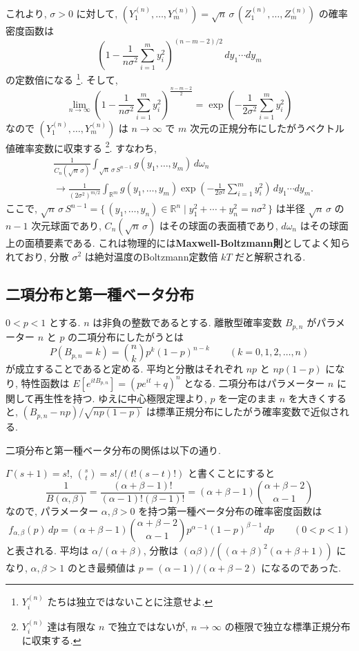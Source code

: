 \documentclass[12pt,twoside]{jarticle}
\newcommand\R{{\mathbb R}} %
\theoremstyle{jplain}
\theoremstyle{jplain}
\theoremstyle{jplain}
\numberwithin{theorem}{section}
\numberwithin{equation}{section}
\numberwithin{figure}{section}
\numberwithin{table}{section}
\begin{document}
これより, $\sigma>0$ に対して, \(
 (Y^{(n)}_1,\ldots,Y^{(n)}_m)
 =\sqrt{n}\,\sigma\,(Z^{(n)}_1,\ldots,Z^{(n)}_m)
\) の確率密度函数は
\[
\left(1-\frac{1}{n\sigma^2}\sum_{i=1}^m y_i^2 \right)^{(n-m-2)/2}\,dy_1\cdots dy_m
\]
の定数倍になる%
\footnote{$Y^{(n)}_i$ たちは独立ではないことに注意せよ.}. そして,
\[
\lim_{n\to\infty}
\left(1-\frac{1}{n\sigma^2}\sum_{i=1}^m y_i^2 \right)^{\frac{n-m-2}{2}}
=\exp\left( -\frac{1}{2\sigma^2} \sum_{i=1}^m y_i^2 \right)
\]
なので $(Y^{(n)}_1,\ldots,Y^{(n)}_m)$ は $n\to\infty$ で
$m$ 次元の正規分布にしたがうベクトル値確率変数に収束する%
\footnote{$Y^{(n)}_i$ 達は有限な $n$ で独立ではないが,
$n\to\infty$ の極限で独立な標準正規分布に収束する.}.
すなわち,
\begin{align*}
&
\frac{1}{C_n(\sqrt{n}\,\sigma)}
\int_{\sqrt{n}\,\sigma\,S^{n-1}} g(y_1,\ldots,y_m) \,d\omega_n
\\ &
\longrightarrow
\frac{1}{(2\sigma^2)^{m/2}}
\int_{\R^m} g(y_1,\ldots,y_m)
\exp\left( -\frac{1}{2\sigma^2}\sum_{i=1}^my_i^2 \right)\,dy_1\cdots dy_m.
\end{align*}
ここで, \(
 \sqrt{n}\,\sigma\,S^{n-1}
 =\{\,(y_1,\ldots,y_n)\in\R^n\mid y_1^2+\cdots+y_n^2=n\sigma^2 \,\}
\) は半径 $\sqrt{n}\,\sigma$ の $n-1$ 次元球面であり,
$C_n(\sqrt{n}\,\sigma)$ はその球面の表面積であり,
$d\omega_n$ はその球面上の面積要素である.
これは物理的には{\bfseries Maxwell-Boltzmann則}としてよく知られており,
分散 $\sigma^2$ は絶対温度のBoltzmann定数倍 $kT$ だと解釈される.


\subsection{二項分布と第一種ベータ分布}
\label{sec:Bin-Beta}

$0<p<1$ とする.
$n$ は非負の整数であるとする.
離散型確率変数 $B_{p,n}$ がパラメーター $n$ と $p$ の二項分布にしたがうとは
\[
P(B_{p,n}=k) = \binom{n}{k}p^k(1-p)^{n-k}
\qquad (k=0,1,2,\ldots,n)
\]
が成立することであると定める.  平均と分散はそれぞれ $np$ と $np(1-p)$ になり,
特性函数は $E[e^{itB_{p,n}}]=(pe^{it}+q)^n$ となる.
二項分布はパラメーター $n$ に関して再生性を持つ.
ゆえに中心極限定理より, $p$ を一定のまま $n$ を大きくすると,
$(B_{p,n}-np)/\sqrt{np(1-p)}$ は標準正規分布にしたがう確率変数で近似される.

二項分布と第一種ベータ分布の関係は以下の通り.

$\Gamma(s+1)=s!$, $\binom{s}{t}=s!/(t!(s-t)!)$ と書くことにすると
\[
\frac{1}{B(\alpha,\beta)}
=\frac{(\alpha+\beta-1)!}{(\alpha-1)!(\beta-1)!}
=(\alpha+\beta-1)\binom{\alpha+\beta-2}{\alpha-1}
\]
なので, パラメーター $\alpha,\beta>0$ を持つ第一種ベータ分布の確率密度函数は
\[
f_{\alpha,\beta}(p)\,dp
=(\alpha+\beta-1)\binom{\alpha+\beta-2}{\alpha-1} p^{\alpha-1}(1-p)^{\beta-1}\,dp
\qquad (0<p<1)
\]
と表される.
平均は $\alpha/(\alpha+\beta)$,
分散は $(\alpha\beta)/((\alpha+\beta)^2(\alpha+\beta+1))$ になり,
$\alpha,\beta>1$ のとき最頻値は $p=(\alpha-1)/(\alpha+\beta-2)$ になるのであった.
\end{document}
